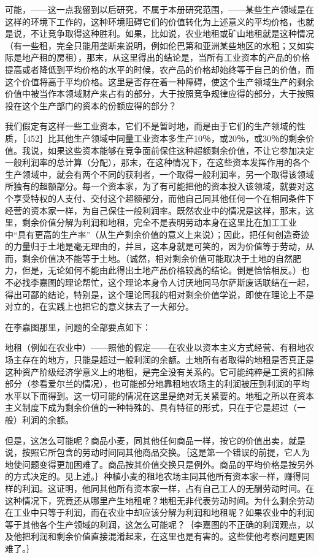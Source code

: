 可能，——这一点我留到以后研究，不属于本册研究范围，——某些生产领域是在这样的环境下工作的，这种环境阻碍它们的价值转化为上述意义的平均价格，也就是说，不让竞争取得这种胜利。如果，比如说，农业地租或矿山地租就是这种情况（有一些租，完全只能用垄断来说明，例如伦巴第和亚洲某些地区的水租；又如实际是地产租的房租），那末，从这里得出的结论是，当所有工业资本的产品的价格提高或者降低到平均价格的水平的时候，农产品的价格却始终等于自己的价值，而这个价值将高于平均价格。这里是否存在着一种障碍，使这个生产领域生产的剩余价值中被当作本领域财产来占有的部分，大于按照竞争规律应得的部分，大于按照投在这个生产部门的资本的份额应得的部分？

我们假定有这样一些工业资本，它们不是暂时地，而是由于它们的生产领域的性质，［452］比其他生产领域中同量工业资本多生产10％，或20％，或30％的剩余价值。我说，如果这些资本能够在竞争面前保住这种超额剩余价值，不让它参加决定一般利润率的总计算（分配），那末，在这种情况下，在这些资本发挥作用的各个生产领域中，就会有两个不同的获利者，一个取得一般利润率，另一个取得该领域所独有的超额部分。每一个资本家，为了有可能把他的资本投入该领域，就要对这个享受特权的人支付、交付这个超额部分，而他自己同其他任何一个在相同条件下经营的资本家一样，为自己保住一般利润率。既然农业中的情况是这样，那末，这里，剩余价值分解为利润和地租，完全不是表明劳动本身在这里比在加工工业中“具有更高的生产率”（从生产剩余价值的意义上来说）；因此，把任何创造奇迹的力量归于土地是毫无理由的，并且，这本身就是可笑的，因为价值等于劳动，从而，剩余价值决不能等于土地。（诚然，相对剩余价值可能取决于土地的自然肥力，但是，无论如何不能由此得出土地产品价格较高的结论。倒是恰恰相反。）也不必找李嘉图的理论帮忙，这个理论本身令人讨厌地同马尔萨斯废话联结在一起，得出可鄙的结论，特别是，这个理论同我的相对剩余价值学说，即使在理论上不是对立的，在实践上也把它的意义抹去了一大部分。

在李嘉图那里，问题的全部要点如下：

地租（例如在农业中）——照他的假定——在农业以资本主义方式经营、有租地农场主存在的地方，只能是超过一般利润的余额。土地所有者取得的地租是否真正是这种资产阶级经济学意义上的地租，是完全没有关系的。它可能纯粹是工资的扣除部分（参看爱尔兰的情况），也可能部分地靠租地农场主的利润被压到利润的平均水平以下而得到。这一切可能的情况在这里是绝对无关紧要的。地租之所以在资本主义制度下成为剩余价值的一种特殊的、具有特征的形式，只在于它是超过（一般）利润的余额。

但是，这怎么可能呢？商品小麦，同其他任何商品一样，按它的价值出卖，就是说，按照它所包含的劳动时间同其他商品交换。｛这是第一个错误的前提，它人为地使问题变得更加困难了。商品按其价值交换只是例外。商品的平均价格是按另外的方式决定的。见上述。｝种植小麦的租地农场主同其他所有资本家一样，赚得同样的利润。这证明，他同其他所有资本家一样，占有自己工人的无酬劳动时间。在这种情况下，究竟还从哪里产生地租呢？地租无非代表劳动时间。为什么剩余劳动在工业中只等于利润，而在农业中却应该分解为利润和地租呢？如果农业中的利润等于其他各个生产领域的利润，这怎么可能呢？｛李嘉图的不正确的利润观点，以及他把利润和剩余价值直接混淆起来，在这里也是有害的。这些使他考察问题更困难了。｝

